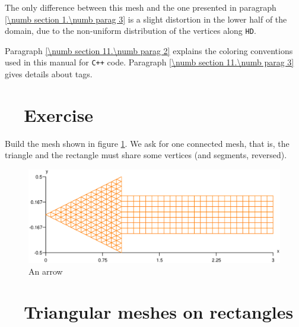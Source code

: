 The only difference between this mesh and the one presented in paragraph
\ref{\numb section 1.\numb parag 3} is a slight distortion in the lower half of the domain,
due to the non-uniform distribution of the vertices along {\small\tt HD}.

Paragraph \ref{\numb section 11.\numb parag 2} explains the coloring conventions used in
this manual for {\tt C++} code.
Paragraph \ref{\numb section 11.\numb parag 3} gives details about \textcolor{tag}{tag}s.


\section{~~Exercise}\label{\numb section 2.\numb parag 2}

Build the mesh shown in figure \ref{\numb section 2.\numb fig 2}.
We ask for one connected mesh, that is, the triangle and the rectangle must share some vertices
(and segments, reversed).

\begin{figure}[ht] \centering
  \includegraphics[width=135mm]{arrow}
  \caption{An arrow}
  \label{\numb section 2.\numb fig 2}
\end{figure}


\section{~~Triangular meshes on rectangles}\label{\numb section 2.\numb parag 3}

